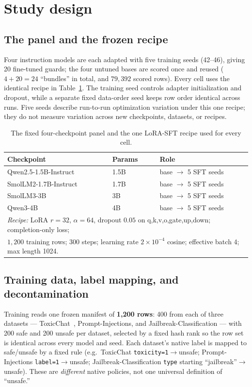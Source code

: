 \documentclass[11pt]{article}
\newcommand{\code}[1]{\texttt{\small #1}}
\begin{document}
\section{Study design}
\label{sec:design}

\subsection{The panel and the frozen recipe}
Four instruction models are each adapted with five training seeds (42--46), giving 20
fine-tuned guards; the four untuned bases are scored once and reused ($4+20=24$ ``bundles''
in total, and $79{,}392$ scored rows). Every cell uses the identical recipe in
Table~\ref{tab:panel}. The training seed controls adapter initialization and dropout, while a
separate fixed data-order seed keeps row order identical across runs. Five seeds describe
run-to-run optimization variation under this one recipe; they do not measure variation across
new checkpoints, datasets, or recipes.

\begin{table}[t]
\centering\small
\caption{The fixed four-checkpoint panel and the one LoRA-SFT recipe used for every cell.}
\label{tab:panel}
\begin{tabular}{lll}
\toprule
Checkpoint & Params & Role \\
\midrule
Qwen2.5-1.5B-Instruct & 1.5B & base $\to$ 5 SFT seeds \\
SmolLM2-1.7B-Instruct & 1.7B & base $\to$ 5 SFT seeds \\
SmolLM3-3B~\cite{bakouch2025smollm3}            & 3B   & base $\to$ 5 SFT seeds \\
Qwen3-4B             & 4B   & base $\to$ 5 SFT seeds \\
\midrule
\multicolumn{3}{l}{\emph{Recipe:} LoRA $r{=}32$, $\alpha{=}64$, dropout $0.05$ on
q,k,v,o,gate,up,down; completion-only loss;}\\
\multicolumn{3}{l}{\phantom{\emph{Recipe:}} $1{,}200$ training rows; 300 steps; learning rate
$2\times10^{-4}$ cosine; effective batch 4; max length 1024.}\\
\bottomrule
\end{tabular}
\end{table}

\subsection{Training data, label mapping, and decontamination}
Training reads one frozen manifest of \textbf{1{,}200 rows}: 400 from each of three datasets
--- ToxicChat~\cite{lin2023toxicchat}, Prompt-Injections, and Jailbreak-Classification --- with 200 safe and 200
unsafe per dataset, selected by a fixed hash rank so the row set is identical across every
model and seed. Each dataset's native label is mapped to safe/unsafe by a fixed rule (e.g.\
ToxicChat \code{toxicity=1}$\to$unsafe; Prompt-Injections \code{label=1}$\to$unsafe;
Jailbreak-Classification \code{type} starting ``jailbreak''$\to$unsafe). These are
\emph{different} native policies, not one universal definition of ``unsafe.''
\end{document}
